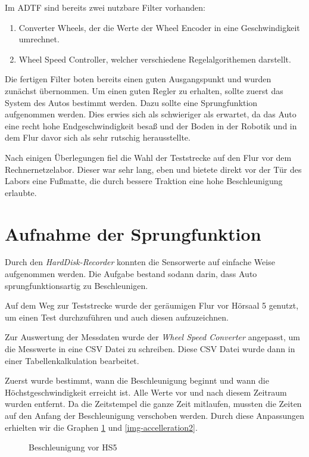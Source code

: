 \documentclass[a4paper,12pt]{report}
\begin{document}
	Im ADTF sind bereits zwei nutzbare Filter vorhanden:
	\begin{enumerate}[label=]
		\item Converter Wheels, der die Werte der Wheel Encoder in eine Geschwindigkeit umrechnet.
		\item Wheel Speed Controller, welcher verschiedene Regelalgorithemen darstellt.
	\end{enumerate}
	Die fertigen Filter boten bereits einen guten Ausgangspunkt und wurden zunächst übernommen.
	Um einen guten Regler zu erhalten, sollte zuerst das System des Autos bestimmt werden.
	Dazu sollte eine Sprungfunktion aufgenommen werden.
	Dies erwies sich als schwieriger als erwartet, da das Auto eine recht hohe Endgeschwindigkeit besaß und der Boden in der Robotik und in dem Flur davor sich als sehr rutschig herausstellte.

	Nach einigen Überlegungen fiel die Wahl der Teststrecke auf den Flur vor dem Rechnernetzelabor.
	Dieser war sehr lang, eben und bietete direkt vor der Tür des Labors eine Fußmatte, die durch bessere Traktion eine hohe Beschleunigung erlaubte.

\section{Aufnahme der Sprungfunktion}
	Durch den \emph{HardDisk-Recorder} konnten die Sensorwerte auf einfache Weise aufgenommen werden.
	Die Aufgabe bestand sodann darin, dass Auto sprungfunktionsartig zu Beschleunigen.

	Auf dem Weg zur Teststrecke wurde der geräumigen Flur vor Hörsaal 5 genutzt, um einen Test durchzuführen und auch diesen aufzuzeichnen.

	Zur Auswertung der Messdaten wurde der \emph{Wheel Speed Converter} angepasst, um die Messwerte in eine CSV Datei zu schreiben.
	Diese CSV Datei wurde dann in einer Tabellenkalkulation bearbeitet.

	Zuerst wurde bestimmt, wann die Beschleunigung beginnt und wann die Höchstgeschwindigkeit erreicht ist.
	Alle Werte vor und nach diesem Zeitraum wurden entfernt.
	Da die Zeitstempel die ganze Zeit mitlaufen, mussten die Zeiten auf den Anfang der Beschleunigung verschoben werden.
	Durch diese Anpassungen erhielten wir die Graphen \ref{img-accelleration1} und \ref{img-accelleration2}.
	\begin{figure}[ht]
		\centering

		\caption{Beschleunigung vor HS5}
		\label{img-accelleration1}
	\end{figure}
\end{document}
